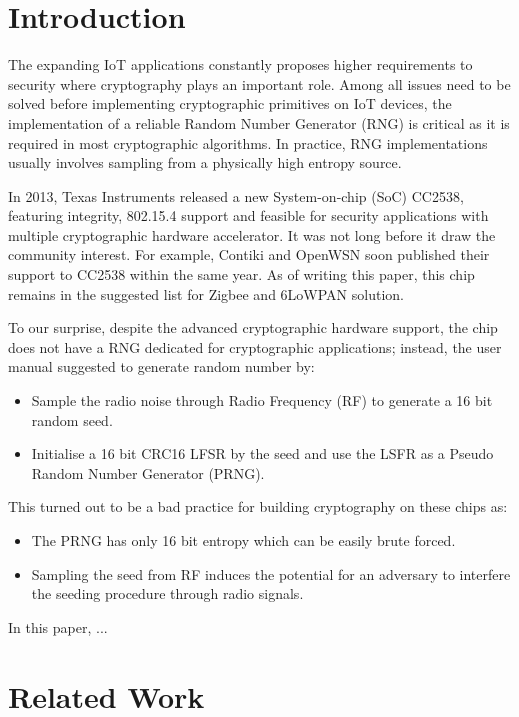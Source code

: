 \section{Introduction}

The expanding IoT applications constantly proposes higher requirements to security where cryptography plays an important role. Among all issues need to be solved before implementing cryptographic primitives on IoT devices, the implementation of a reliable Random Number Generator (RNG) is critical as it is required in most cryptographic algorithms. In practice, RNG implementations usually involves sampling from a physically high entropy source.

In 2013, Texas Instruments released a new System-on-chip (SoC)  CC2538\cite{CC2538}, featuring integrity, 802.15.4 support and feasible for security applications with multiple cryptographic hardware accelerator. It was not long before it draw the community interest. For example, Contiki and OpenWSN soon published their support to CC2538 within the same year. As of writing this paper, this chip remains in the suggested list for Zigbee and 6LoWPAN solution.

To our surprise, despite the advanced cryptographic hardware support, the chip does not have a RNG dedicated for cryptographic applications; instead, the user manual suggested to generate random number by:
\begin{itemize}
	\item Sample the radio noise through Radio Frequency (RF) to generate a 16 bit random seed.
	\item Initialise a 16 bit CRC16 LFSR by the seed and use the LSFR as a Pseudo Random Number Generator (PRNG).
\end{itemize}

This turned out to be a bad practice for building cryptography on these chips as:
\begin{itemize}
	\item The PRNG has only 16 bit entropy which can be easily brute forced.
	\item Sampling the seed from RF induces the potential for an adversary to interfere the seeding procedure through radio signals.
\end{itemize}

In this paper, ...


\section{Related Work}
